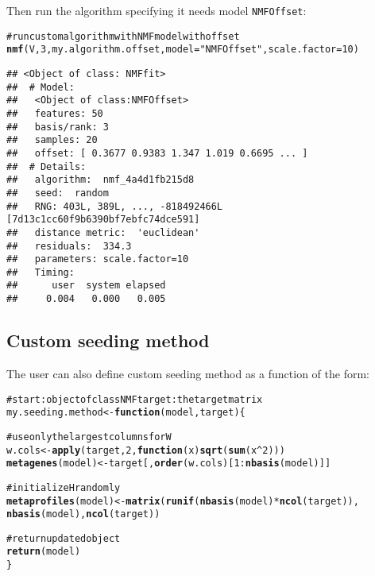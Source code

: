 \documentclass[a4paper]{article}\usepackage{graphicx, color}
\makeatletter
\newcommand{\hlfunctioncall}[1]{\textcolor[rgb]{0.501960784313725,0,0.329411764705882}{\textbf{#1}}}%
\newcommand{\hlstring}[1]{\textcolor[rgb]{0.6,0.6,1}{#1}}%
\newcommand{\hlcomment}[1]{\textcolor[rgb]{0.180392156862745,0.6,0.341176470588235}{#1}}%
\newenvironment{kframe}{%
 \def\at@end@of@kframe{}%
 \ifinner\ifhmode%
  \def\at@end@of@kframe{\end{minipage}}%
  \begin{minipage}{\columnwidth}%
 \fi\fi%
 \def\FrameCommand##1{\hskip\@totalleftmargin \hskip-\fboxsep
 \colorbox{shadecolor}{##1}\hskip-\fboxsep
     \hskip-\linewidth \hskip-\@totalleftmargin \hskip\columnwidth}%
 \MakeFramed {\advance\hsize-\width
   \@totalleftmargin\z@ \linewidth\hsize
   \@setminipage}}%
 {\par\unskip\endMakeFramed%
 \at@end@of@kframe}
\newenvironment{knitrout}{}{} %
\let\code=\texttt
\makeatother
\begin{document}
Then run the algorithm specifying it needs model \code{NMFOffset}:
\begin{knitrout}
\color{fgcolor}\begin{kframe}
\begin{alltt}
\hlcomment{# run custom algorithm with NMF model with offset}
\hlfunctioncall{nmf}(V, 3, my.algorithm.offset, model = \hlstring{"NMFOffset"}, scale.factor = 10)
\end{alltt}
\begin{verbatim}
## <Object of class: NMFfit>
##  # Model:
##   <Object of class:NMFOffset>
##   features: 50 
##   basis/rank: 3 
##   samples: 20 
##   offset: [ 0.3677 0.9383 1.347 1.019 0.6695 ... ]
##  # Details:
##   algorithm:  nmf_4a4d1fb215d8 
##   seed:  random 
##   RNG: 403L, 389L, ..., -818492466L [7d13c1cc60f9b6390bf7ebfc74dce591]
##   distance metric:  'euclidean' 
##   residuals:  334.3 
##   parameters: scale.factor=10 
##   Timing:
##      user  system elapsed 
##     0.004   0.000   0.005
\end{verbatim}
\end{kframe}
\end{knitrout}



\subsection{Custom seeding method}\label{sec:seed_custom}

The user can also define custom seeding method as a function of the form:


\begin{knitrout}
\color{fgcolor}\begin{kframe}
\begin{alltt}

\hlcomment{# start: object of class NMF target: the target matrix}
my.seeding.method <- \hlfunctioncall{function}(model, target) \{
    
\hlcomment{    # use only the largest columns for W}
    w.cols <- \hlfunctioncall{apply}(target, 2, \hlfunctioncall{function}(x) \hlfunctioncall{sqrt}(\hlfunctioncall{sum}(x^2)))
    \hlfunctioncall{metagenes}(model) <- target[, \hlfunctioncall{order}(w.cols)[1:\hlfunctioncall{nbasis}(model)]]
    
\hlcomment{    # initialize H randomly}
    \hlfunctioncall{metaprofiles}(model) <- \hlfunctioncall{matrix}(\hlfunctioncall{runif}(\hlfunctioncall{nbasis}(model) * \hlfunctioncall{ncol}(target)), 
        \hlfunctioncall{nbasis}(model), \hlfunctioncall{ncol}(target))
    
\hlcomment{    # return updated object}
    \hlfunctioncall{return}(model)
\}
\end{alltt}
\end{kframe}
\end{knitrout}
\end{document}
